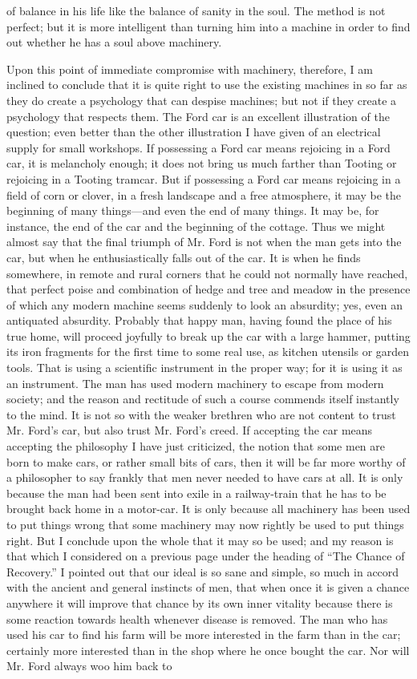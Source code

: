 \documentclass{book}
\begin{document}
of balance in his life like the balance of sanity in the soul. The method is not perfect; but it is more intelligent than turning him into a machine in order to find out whether he has a soul above machinery.

Upon this point of immediate compromise with machinery, therefore, I am inclined to conclude that it is quite right to use the existing machines in so far as they do create a psychology that can despise machines; but not if they create a psychology that respects them. The Ford car is an excellent illustration of the question; even better than the other illustration I have given of an electrical supply for small workshops. If possessing a Ford car means rejoicing in a Ford car, it is melancholy enough; it does not bring us much farther than Tooting or rejoicing in a Tooting tramcar. But if possessing a Ford car means rejoicing in a field of corn or clover, in a fresh landscape and a free atmosphere, it may be the beginning of many things—and even the end of many things. It may be, for instance, the end of the car and the beginning of the cottage. Thus we might almost say that the final triumph of Mr. Ford is not when the man gets into the car, but when he enthusiastically falls out of the car. It is when he finds somewhere, in remote and rural corners that he could not normally have reached, that perfect poise and combination of hedge and tree and meadow in the presence of which any modern machine seems suddenly to look an absurdity; yes, even an antiquated absurdity. Probably that happy man, having found the place of his true home, will proceed joyfully to break up the car with a large hammer, putting its iron fragments for the first time to some real use, as kitchen utensils or garden tools. That is using a scientific instrument in the proper way; for it is using it as an instrument. The man has used modern machinery to escape from modern society; and the reason and rectitude of such a course commends itself instantly to the mind. It is not so with the weaker brethren who are not content to trust Mr. Ford’s car, but also trust Mr. Ford’s creed. If accepting the car means accepting the philosophy I have just criticized, the notion that some men are born to make cars, or rather small bits of cars, then it will be far more worthy of a philosopher to say frankly that men never needed to have cars at all. It is only because the man had been sent into exile in a railway-train that he has to be brought back home in a motor-car. It is only because all machinery has been used to put things wrong that some machinery may now rightly be used to put things right. But I conclude upon the whole that it may so be used; and my reason is that which I considered on a previous page under the heading of “The Chance of Recovery.” I pointed out that our ideal is so sane and simple, so much in accord with the ancient and general instincts of men, that when once it is given a chance anywhere it will improve that chance by its own inner vitality because there is some reaction towards health whenever disease is removed. The man who has used his car to find his farm will be more interested in the farm than in the car; certainly more interested than in the shop where he once bought the car. Nor will Mr. Ford always woo him back to 
\end{document}
